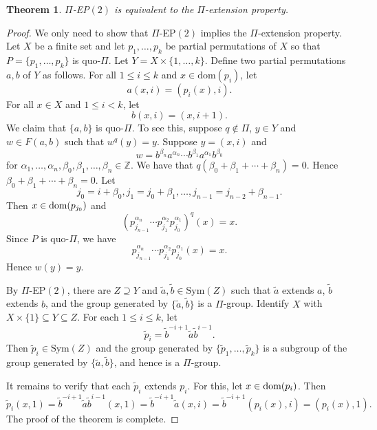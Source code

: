 \documentclass[10pt,a4paper]{amsart}
\newtheorem{theorem}{Theorem}[section]
\theoremstyle{definition}
\newcommand{\dom}{{\mbox{\rm dom}}}
\theoremstyle{definition}
\numberwithin{equation}{section}
\begin{document}
\begin{theorem}\label{thm:EP2} $\Pi$-{\rm EP}$(2)$ is equivalent to the $\Pi$-extension property.
\end{theorem}
\begin{proof} We only need to show that $\Pi$-EP$(2)$ implies the $\Pi$-extension property. Let $X$ be a finite set and let $p_1,\dots, p_k$ be partial permutations of $X$ so that $P=\{p_1,\dots, p_k\}$ is quo-$\Pi$. Let $Y=X\times\{1,\dots, k\}$. Define two partial permutations $a, b$ of $Y$ as follows. For all $1\leq i\leq k$ and $x\in \mbox{dom}(p_i)$, let
$$ a(x, i)=(p_i(x), i). $$
For all $x\in X$ and $1\leq i<k$, let
$$ b(x,i)=(x,i+1). $$
We claim that $\{a, b\}$ is quo-$\Pi$. To see this, suppose $q\not\in \Pi$, $y\in Y$ and $w\in F(a,b)$ such that $w^q(y)=y$. Suppose $y=(x,i)$ and 
$$ w=b^{\beta_n}a^{\alpha_n}\cdots b^{\beta_1}a^{\alpha_1}b^{\beta_0} $$
for $\alpha_1,\dots, \alpha_n, \beta_0, \beta_1,\dots, \beta_n\in \mathbb{Z}$. We have that $q(\beta_0+\beta_1+\cdots+\beta_n)=0$. Hence $\beta_0+\beta_1+\cdots+\beta_n=0$.  Let 
$$j_0=i+\beta_0, j_1=j_0+\beta_1, \dots, j_{n-1}=j_{n-2}+\beta_{n-1}. $$ Then $x\in\dom(p_{j_0})$ and
$$ (p_{j_{n-1}}^{\alpha_n}\cdots p_{j_1}^{\alpha_2}p_{j_0}^{\alpha_1})^q(x)=x. $$
Since $P$ is quo-$\Pi$, we have
$$ p_{j_{n-1}}^{\alpha_n}\cdots p_{j_1}^{\alpha_2}p_{j_0}^{\alpha_1}(x)=x. $$
Hence $w(y)=y$. 

By $\Pi$-EP$(2)$, there are $Z\supseteq Y$ and $\tilde{a}, \tilde{b}\in \mbox{Sym}(Z)$ such that $\tilde{a}$ extends $a$,  $\tilde{b}$ extends $b$, and the group generated by $\{\tilde{a}, \tilde{b}\}$ is a $\Pi$-group. Identify $X$ with $X\times \{1\}\subseteq Y\subseteq Z$. For each $1\leq i\leq k$, let
$$ \tilde{p}_i=\tilde{b}^{-i+1}\tilde{a}\tilde{b}^{i-1}. $$
Then $\tilde{p}_i\in \mbox{Sym}(Z)$ and the group generated by $\{\tilde{p}_1, \dots, \tilde{p}_k\}$ is a subgroup of the group generated by $\{\tilde{a}, \tilde{b}\}$, and hence is a $\Pi$-group.

It remains to verify that each $\tilde{p}_i$ extends $p_i$. For this, let $x\in \dom(p_i)$. Then
$$ \tilde{p}_i(x, 1)=\tilde{b}^{-i+1}\tilde{a}\tilde{b}^{i-1}(x, 1)=\tilde{b}^{-i+1}\tilde{a}(x, i)=\tilde{b}^{-i+1}(p_i(x), i)=(p_i(x), 1). $$
The proof of the theorem is complete.
\end{proof}
\end{document}
